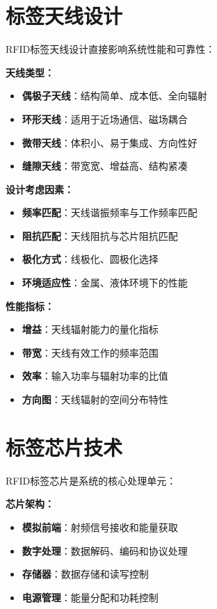\documentclass[12pt,UTF8]{ctexbook}
\begin{document}
\begin{itemize}[leftmargin=3.5em]
\begin{itemize}[leftmargin=3.5em]
\section{标签天线设计}

RFID标签天线设计直接影响系统性能和可靠性：

\textbf{天线类型：}
\begin{itemize}[leftmargin=3.5em]
    \item \textbf{偶极子天线}：结构简单、成本低、全向辐射
    \item \textbf{环形天线}：适用于近场通信、磁场耦合
    \item \textbf{微带天线}：体积小、易于集成、方向性好
    \item \textbf{缝隙天线}：带宽宽、增益高、结构紧凑
\end{itemize}

\textbf{设计考虑因素：}
\begin{itemize}[leftmargin=3.5em]
    \item \textbf{频率匹配}：天线谐振频率与工作频率匹配
    \item \textbf{阻抗匹配}：天线阻抗与芯片阻抗匹配
    \item \textbf{极化方式}：线极化、圆极化选择
    \item \textbf{环境适应性}：金属、液体环境下的性能
\end{itemize}

\textbf{性能指标：}
\begin{itemize}[leftmargin=3.5em]
    \item \textbf{增益}：天线辐射能力的量化指标
    \item \textbf{带宽}：天线有效工作的频率范围
    \item \textbf{效率}：输入功率与辐射功率的比值
    \item \textbf{方向图}：天线辐射的空间分布特性
\end{itemize}

\section{标签芯片技术}

RFID标签芯片是系统的核心处理单元：

\textbf{芯片架构：}
\begin{itemize}[leftmargin=3.5em]
    \item \textbf{模拟前端}：射频信号接收和能量获取
    \item \textbf{数字处理}：数据解码、编码和协议处理
    \item \textbf{存储器}：数据存储和读写控制
    \item \textbf{电源管理}：能量分配和功耗控制
\end{itemize}


\end{itemize}
\end{itemize}
\end{document}
